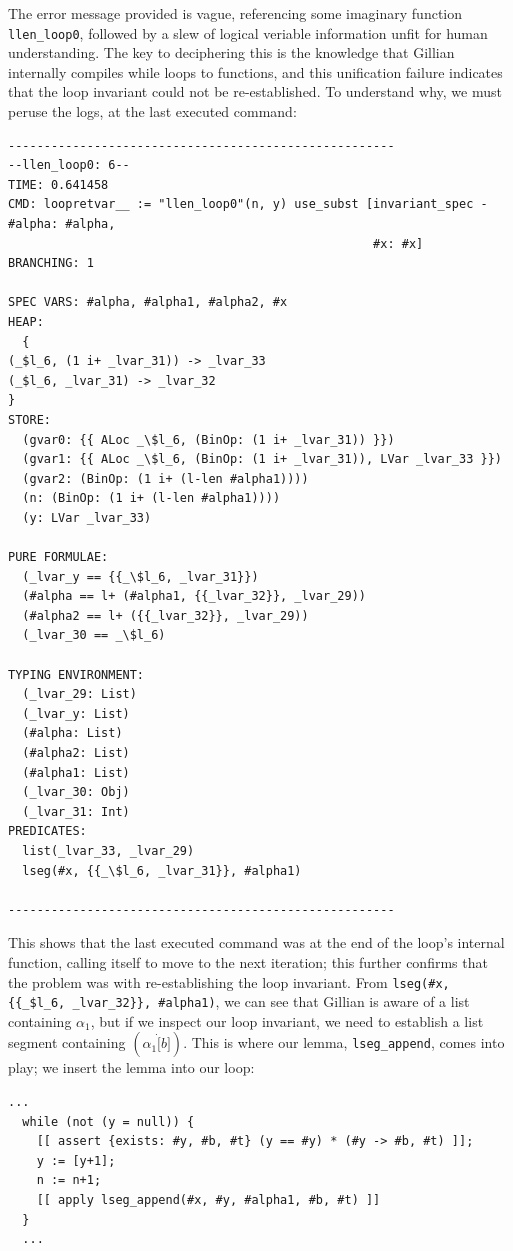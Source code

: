 The error message provided is vague, referencing some imaginary function
\texttt{llen\_loop0}, followed by a slew of logical veriable information unfit
for human understanding. The key to deciphering this is the knowledge that
Gillian internally compiles while loops to functions, and this unification
failure indicates that the loop invariant could not be re-established. To
understand why, we must peruse the logs, at the last executed command:
\begin{lstlisting}[style=code, numbers=none, caption={Loop invariant failure - Gillian log file}]
------------------------------------------------------
--llen_loop0: 6--
TIME: 0.641458
CMD: loopretvar__ := "llen_loop0"(n, y) use_subst [invariant_spec - #alpha: #alpha,
                                                   #x: #x]
BRANCHING: 1

SPEC VARS: #alpha, #alpha1, #alpha2, #x
HEAP:
  {
(_$l_6, (1 i+ _lvar_31)) -> _lvar_33
(_$l_6, _lvar_31) -> _lvar_32
}
STORE:
  (gvar0: {{ ALoc _\$l_6, (BinOp: (1 i+ _lvar_31)) }})
  (gvar1: {{ ALoc _\$l_6, (BinOp: (1 i+ _lvar_31)), LVar _lvar_33 }})
  (gvar2: (BinOp: (1 i+ (l-len #alpha1))))
  (n: (BinOp: (1 i+ (l-len #alpha1))))
  (y: LVar _lvar_33)

PURE FORMULAE:
  (_lvar_y == {{_\$l_6, _lvar_31}})
  (#alpha == l+ (#alpha1, {{_lvar_32}}, _lvar_29))
  (#alpha2 == l+ ({{_lvar_32}}, _lvar_29))
  (_lvar_30 == _\$l_6)

TYPING ENVIRONMENT:
  (_lvar_29: List)
  (_lvar_y: List)
  (#alpha: List)
  (#alpha2: List)
  (#alpha1: List)
  (_lvar_30: Obj)
  (_lvar_31: Int)
PREDICATES:
  list(_lvar_33, _lvar_29)
  lseg(#x, {{_\$l_6, _lvar_31}}, #alpha1)

------------------------------------------------------
\end{lstlisting}


This shows that the last executed command was at the end of the loop's internal
function, calling itself to move to the next iteration; this further confirms
that the problem was with re-establishing the loop invariant. From
\texttt{lseg(\#x, \{\{\_\$l\_6, \_lvar\_32\}\}, \#alpha1)}, we can see that Gillian
is aware of a list containing $\alpha_1$, but if we inspect our loop invariant,
we need to establish a list segment containing $(\alpha_1 \dot [b])$. This is
where our lemma, \texttt{lseg\_append}, comes into play; we insert the lemma
into our loop:
\begin{lstlisting}[style=code, numbers=none, caption={Applying \texttt{lseg\_append}}]
  ...
  while (not (y = null)) {
    [[ assert {exists: #y, #b, #t} (y == #y) * (#y -> #b, #t) ]];
    y := [y+1];
    n := n+1;
    [[ apply lseg_append(#x, #y, #alpha1, #b, #t) ]]
  }
  ...
\end{lstlisting}

